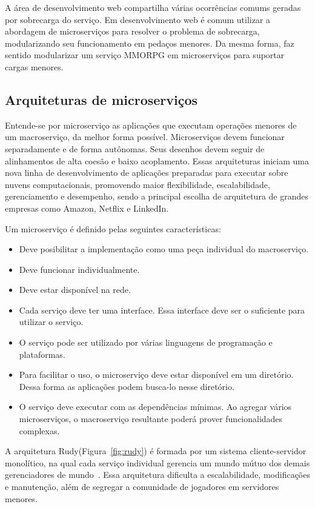A área de desenvolvimento web compartilha várias ocorrências comums geradas por sobrecarga do serviço\cite{7830692}.
%
Em desenvolvimento web é comum utilizar a abordagem de microserviços para resolver o problema de sobrecarga, modularizando seu funcionamento em pedaços menores.
Da mesma forma, faz sentido modularizar um serviço \ac{MMORPG} em microserviços para suportar cargas menores.

\subsection{Arquiteturas de microserviços}

Entende-se por microserviço as aplicações que executam operações menores de um macroserviço, da melhor forma possível\cite{stephenclarkewillson2017}.
%
Microserviços devem funcionar separadamente e de forma autônomas. Seus desenhos devem seguir de alinhamentos de alta coesão e baixo acoplamento\cite{8169955}.
%
Essas arquiteturas iniciam uma nova linha de desenvolvimento de aplicações preparadas para executar sobre nuvens computacionais, promovendo maior flexibilidade, escalabilidade, gerenciamento e desempenho, sendo a principal escolha de arquitetura de grandes empresas como Amazon, Netflix e LinkedIn\cite{7830692}\cite{7515686}.

Um microserviço é definido pelas seguintes características\cite{8169955}:

\begin{itemize}
  \item Deve posibilitar a implementação como uma peça individual do macroserviço.
  \item Deve funcionar individualmente.
  \item Deve estar disponível na rede.
  \item Cada serviço deve ter uma interface. Essa interface deve ser o suficiente para utilizar o serviço.
  \item O serviço pode ser utilizado por várias linguagens de programação e plataformas.
  \item Para facilitar o uso, o microserviço deve estar disponível em um diretório. Dessa forma as aplicações podem busca-lo nesse diretório.
  \item O serviço deve executar com as dependências mínimas. Ao agregar vários microserviços, o macroserviço resultante poderá prover funcionalidades complexas.
\end{itemize}

A arquitetura Rudy(Figura~\ref{fig:rudy}) é formada por um sistema cliente-servidor monolítico, na qual cada
serviço individual gerencia um mundo mútuo dos demais gerenciadores de mundo~\cite{matthiasrudy2011}.
%
Essa arquitetura dificulta a escalabilidade, modificações e manutenção\cite{8169955}, além de segregar a comunidade de jogadores em servidores menores\cite{matthiasrudy2011}.

